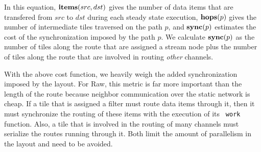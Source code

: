 In this equation, ${\bf items}(src, dst)$ gives the number of data
items that are transfered from $src$ to $dst$ during each steady state
execution, ${\bf hops}(p)$ gives the number of intermediate tiles
traversed on the path $p$, and ${\bf sync}(p)$ estimates the cost of
the synchronization imposed by the path $p$.  We calculate ${\bf
sync}(p)$ as the number of tiles along the route that are assigned a
stream node plus the number of tiles along the route that are involved
in routing {\it other} channels.

With the above cost function, we heavily weigh the added
synchronization imposed by the layout.  For Raw, this metric is far
more important than the length of the route because neighbor
communication over the static network is cheap.  If a tile that is
assigned a filter must route data items through it, then it must
synchronize the routing of these items with the execution of its {\tt
work} function.  Also, a tile that is involved in the routing of many
channels must serialize the routes running through it.  Both limit the
amount of parallelism in the layout and need to be avoided.


